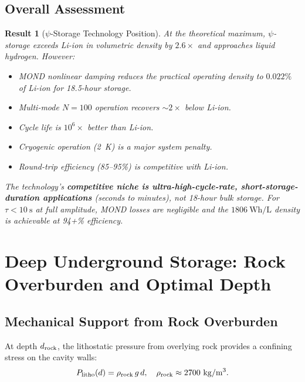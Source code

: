 \documentclass[aps,prd,twocolumn,superscriptaddress]{revtex4-2}
\newtheorem{result}{Result}
\begin{document}
\subsection{Overall Assessment}

\begin{result}[$\psi$-Storage Technology Position]
At the theoretical maximum, $\psi$-storage exceeds Li-ion in volumetric
density by $2.6\times$ and approaches liquid hydrogen.  However:
\begin{itemize}
\item MOND nonlinear damping reduces the practical operating density
to $0.022\%$ of Li-ion for 18.5-hour storage.
\item Multi-mode $N = 100$ operation recovers $\sim 2\times$ below Li-ion.
\item Cycle life is $10^6\times$ better than Li-ion.
\item Cryogenic operation (2~K) is a major system penalty.
\item Round-trip efficiency (85--95\%) is competitive with Li-ion.
\end{itemize}
The technology's \textbf{competitive niche is ultra-high-cycle-rate,
short-storage-duration applications} (seconds to minutes), not
18-hour bulk storage.  For $\tau < 10~\mathrm{s}$ at full amplitude,
MOND losses are negligible and the $1806~\mathrm{Wh/L}$ density is
achievable at 94+\% efficiency.
\end{result}

\section{Deep Underground Storage: Rock Overburden and Optimal Depth}
\label{sec:underground}

\subsection{Mechanical Support from Rock Overburden}

At depth $d_{\rm rock}$, the lithostatic pressure from overlying rock
provides a confining stress on the cavity walls:
\begin{equation}
P_{\rm litho}(d) = \rho_{\rm rock}\,g\,d,
\quad \rho_{\rm rock} \approx 2700~\mathrm{kg/m^3}.
\end{equation}
\end{document}
